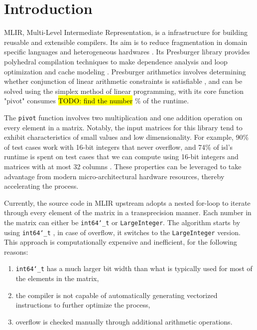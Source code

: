 \documentclass[logo,bsc,singlespacing,parskip]{infthesis}
\newcommand{\dtlong}{\texttt{int64\char`_t} }
\begin{document}
\chapter{Introduction}
\label{sec:introduction}

MLIR, Multi-Level Intermediate Representation, is a infrastructure for building
reusable and extensible compilers. Its aim is to reduce fragmentation in domain
specific languages and heterogeneous hardwares \cite{mlir}. Its Presburger
library provides polyhedral compilation techniques to make dependence analysis
and loop optimization \cite{mliraffine} and cache modeling \cite{CacheModel}.
Presburger arithmetics involves determining whether conjunction of linear
arithmetic constraints is satisfiable \cite{SMLPPA}, and can be solved using the
simplex method of linear programming, with its core function "pivot" consumes
\hl{TODO: find the number} \% \cite{FPL1} of the runtime. 

The \texttt{pivot} function involves two multiplication and one addition
operation on every element in a matrix. Notably, the input matrices for this
library tend to exhibit characteristics of small values and low dimensionality.
For example, 90\% of test cases work with 16-bit integers that never overflow,
and 74\% of isl’s runtime is spent on test cases that we can compute using
16-bit integers and matrices with at most 32 columns \cite{FPL2}. These
properties can be leveraged to take advantage from modern micro-architectural
hardware resources, thereby accelerating the process.

Currently, the source code in MLIR upstream adopts a nested for-loop to iterate
through every element of the matrix in a transprecision manner. Each number in
the matrix can either be \dtlong or \texttt{LargeInteger}. The
algorithm starts by using \dtlong, in case of overflow, it switches to
the \texttt{LargeInteger} version. This approach is computationally expensive
and inefficient, for the following reasons: 
\begin{enumerate}

\item \dtlong has a much larger bit width than what is typically
used for most of the elements in the matrix,

\item the compiler is not capable of automatically generating vectorized
instructions to further optimize the process,

\item overflow is checked manually through additional arithmetic
operations.

\end{enumerate}
\end{document}
